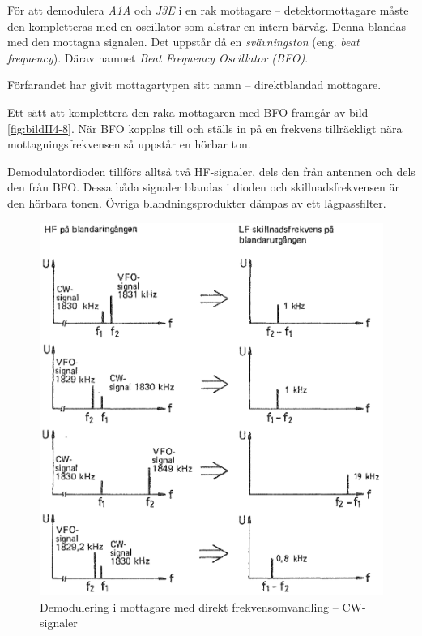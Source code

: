 För att demodulera \emph{A1A} och \emph{J3E} i en rak mottagare --
detektormottagare måste den kompletteras med en oscillator som alstrar en
intern bärvåg.
Denna blandas med den mottagna signalen.
Det uppstår då en \emph{svävningston} (eng. \emph{beat frequency}).
Därav namnet \emph{Beat Frequency Oscillator (BFO)}.

Förfarandet har givit mottagartypen sitt namn -- direktblandad mottagare.

Ett sätt att komplettera den raka mottagaren med BFO framgår av bild
\ref{fig:bildII4-8}.
När BFO kopplas till och ställs in på en frekvens tillräckligt
nära mottagningsfrekvensen så uppstår en hörbar ton.

Demodulatordioden tillförs alltså två HF-signaler, dels den från
antennen och dels den från BFO.
Dessa båda signaler blandas i dioden och skillnadsfrekvensen är den hörbara
tonen.
Övriga blandningsprodukter dämpas av ett lågpassfilter.

\begin{figure}
  \includegraphics[width=\textwidth]{images/cropped_pdfs/bild_2_4-09.pdf}
  \caption{Demodulering i mottagare med direkt frekvensomvandling -- CW-signaler}
  \label{fig:bildII4-9}
\end{figure}

